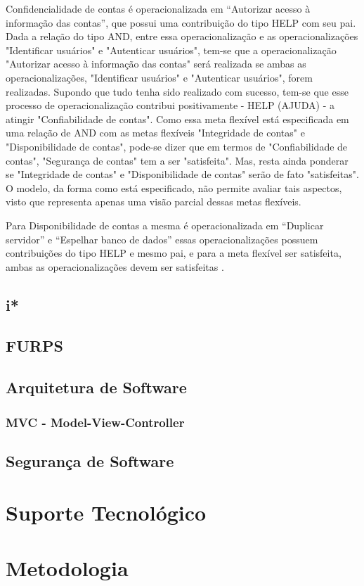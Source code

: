 Confidencialidade de contas é operacionalizada em “Autorizar acesso à informação das contas”, que possui uma contribuição do tipo HELP com seu pai. Dada a relação do tipo AND, entre essa operacionalização e as operacionalizações "Identificar usuários" e "Autenticar usuários", tem-se que a operacionalização "Autorizar acesso à informação das contas"  será realizada se ambas as operacionalizações, "Identificar usuários" e "Autenticar usuários", forem realizadas. Supondo que tudo tenha sido realizado com sucesso, tem-se que esse processo de operacionalização contribui positivamente - HELP (AJUDA) - a atingir "Confiabilidade de contas". Como essa meta flexível está especificada em uma relação de AND com as metas flexíveis "Integridade de contas" e "Disponibilidade de contas", pode-se dizer que em termos de "Confiabilidade de contas", "Segurança de contas" tem a ser "satisfeita". Mas, resta ainda ponderar se "Integridade de contas" e "Disponibilidade de contas" serão de fato "satisfeitas". O modelo, da forma como está especificado, não permite avaliar tais aspectos, visto que representa apenas uma visão parcial dessas metas flexíveis.


Para Disponibilidade de contas a mesma é operacionalizada em “Duplicar servidor” e “Espelhar banco de dados” essas operacionalizações possuem contribuições do tipo HELP e mesmo pai, e para a meta flexível ser satisfeita, ambas as operacionalizações devem ser satisfeitas \cite{affleck2012supporting}. 


\section{i*}
\label{sec:i*}

\section{FURPS}


\section{Arquitetura de Software}

\subsection{MVC - Model-View-Controller}

\section{Segurança de Software}

\chapter{Suporte Tecnológico}

\chapter{Metodologia}
